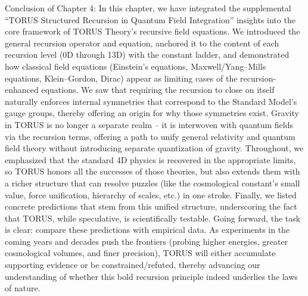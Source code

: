 \documentclass[]{article}
\begin{document}
Conclusion of Chapter 4: In this chapter, we have integrated the
supplemental ``TORUS Structured Recursion in Quantum Field Integration''
insights into the core framework of TORUS Theory's recursive field
equations. We introduced the general recursion operator and equation,
anchored it to the content of each recursion level (0D through 13D) with
the constant ladder, and demonstrated how classical field equations
(Einstein's equations, Maxwell/Yang--Mills equations, Klein--Gordon,
Dirac) appear as limiting cases of the recursion-enhanced equations. We
saw that requiring the recursion to close on itself naturally enforces
internal symmetries that correspond to the Standard Model's gauge
groups, thereby offering an origin for why those symmetries exist.
Gravity in TORUS is no longer a separate realm -- it is interwoven with
quantum fields via the recursion terms, offering a path to unify general
relativity and quantum field theory without introducing separate
quantization of gravity. Throughout, we emphasized that the standard 4D
physics is recovered in the appropriate limits, so TORUS honors all the
successes of those theories, but also extends them with a richer
structure that can resolve puzzles (like the cosmological constant's
small value, force unification, hierarchy of scales, etc.) in one
stroke. Finally, we listed concrete predictions that stem from this
unified structure, underscoring the fact that TORUS, while speculative,
is scientifically testable. Going forward, the task is clear: compare
these predictions with empirical data. As experiments in the coming
years and decades push the frontiers (probing higher energies, greater
cosmological volumes, and finer precision), TORUS will either accumulate
supporting evidence or be constrained/refuted, thereby advancing our
understanding of whether this bold recursion principle indeed underlies
the laws of nature.
\end{document}
